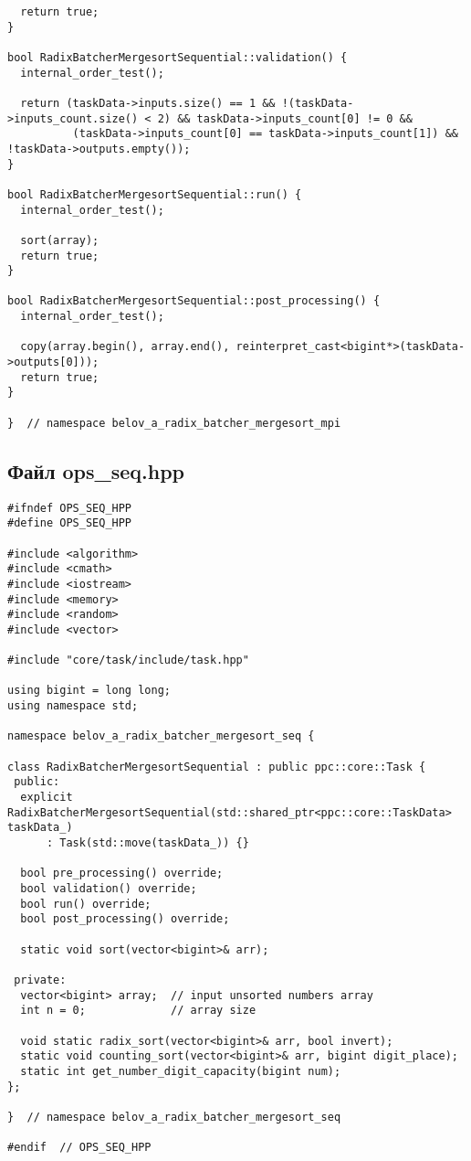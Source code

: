 ﻿\documentclass[a4paper,12pt]{article}
\begin{document}
\begin{lstlisting}
  return true;
}

bool RadixBatcherMergesortSequential::validation() {
  internal_order_test();

  return (taskData->inputs.size() == 1 && !(taskData->inputs_count.size() < 2) && taskData->inputs_count[0] != 0 &&
          (taskData->inputs_count[0] == taskData->inputs_count[1]) && !taskData->outputs.empty());
}

bool RadixBatcherMergesortSequential::run() {
  internal_order_test();

  sort(array);
  return true;
}

bool RadixBatcherMergesortSequential::post_processing() {
  internal_order_test();

  copy(array.begin(), array.end(), reinterpret_cast<bigint*>(taskData->outputs[0]));
  return true;
}

}  // namespace belov_a_radix_batcher_mergesort_mpi
\end{lstlisting}

\subsection*{Файл ops\_seq.hpp}
\begin{lstlisting}
#ifndef OPS_SEQ_HPP
#define OPS_SEQ_HPP

#include <algorithm>
#include <cmath>
#include <iostream>
#include <memory>
#include <random>
#include <vector>

#include "core/task/include/task.hpp"

using bigint = long long;
using namespace std;

namespace belov_a_radix_batcher_mergesort_seq {

class RadixBatcherMergesortSequential : public ppc::core::Task {
 public:
  explicit RadixBatcherMergesortSequential(std::shared_ptr<ppc::core::TaskData> taskData_)
      : Task(std::move(taskData_)) {}

  bool pre_processing() override;
  bool validation() override;
  bool run() override;
  bool post_processing() override;

  static void sort(vector<bigint>& arr);

 private:
  vector<bigint> array;  // input unsorted numbers array
  int n = 0;             // array size

  void static radix_sort(vector<bigint>& arr, bool invert);
  static void counting_sort(vector<bigint>& arr, bigint digit_place);
  static int get_number_digit_capacity(bigint num);
};

}  // namespace belov_a_radix_batcher_mergesort_seq

#endif  // OPS_SEQ_HPP
\end{lstlisting}
\end{document}
